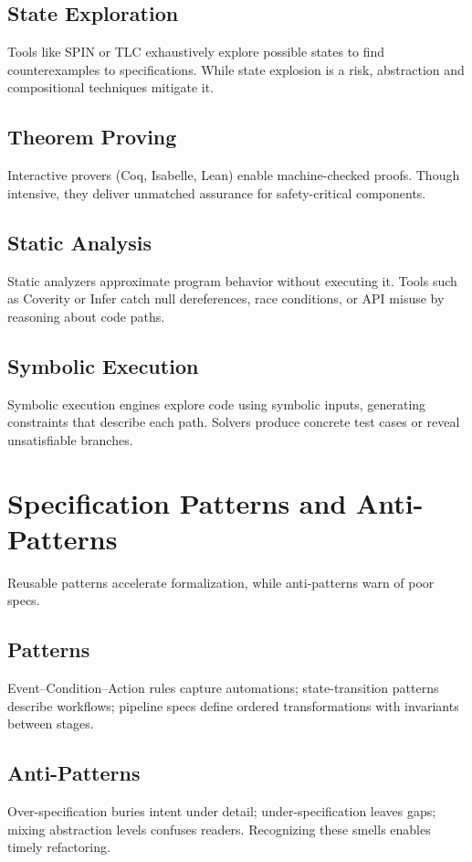 \subsection{State Exploration}
Tools like SPIN or TLC exhaustively explore possible states to find counterexamples to specifications. While state explosion is a risk, abstraction and compositional techniques mitigate it.

\subsection{Theorem Proving}
Interactive provers (Coq, Isabelle, Lean) enable machine-checked proofs. Though intensive, they deliver unmatched assurance for safety-critical components.

\subsection{Static Analysis}
Static analyzers approximate program behavior without executing it. Tools such as Coverity or Infer catch null dereferences, race conditions, or API misuse by reasoning about code paths.

\subsection{Symbolic Execution}
Symbolic execution engines explore code using symbolic inputs, generating constraints that describe each path. Solvers produce concrete test cases or reveal unsatisfiable branches.

\section{Specification Patterns and Anti-Patterns}
\label{sec:spec-patterns}

Reusable patterns accelerate formalization, while anti-patterns warn of poor specs.

\subsection{Patterns}
Event--Condition--Action rules capture automations; state-transition patterns describe workflows; pipeline specs define ordered transformations with invariants between stages.

\subsection{Anti-Patterns}
Over-specification buries intent under detail; under-specification leaves gaps; mixing abstraction levels confuses readers. Recognizing these smells enables timely refactoring.

